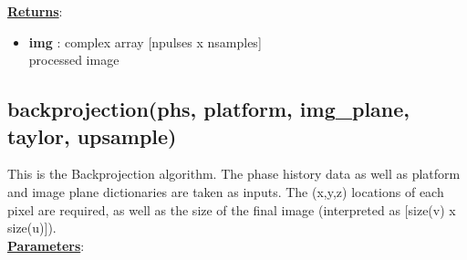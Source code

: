 \documentclass{article}
\newcommand{\defs}[2]{\textbf{{#1}} : {#2}}
\begin{document}
\noindent \underline{\textbf{Returns}}:
\begin{itemize}
	\item \defs{img}{complex array [npulses x nsamples]}\\
	processed image
\end{itemize}

\subsection{backprojection(phs, platform, img\_plane, taylor, \mbox{upsample})}
This is the Backprojection algorithm.  The phase history data as well as platform and image plane dictionaries are taken as inputs.  The (x,y,z) locations of each pixel are required, as well as the size of the final image (interpreted as [size(v) x size(u)]).\\

\noindent \underline{\textbf{Parameters}}:
\end{document}
